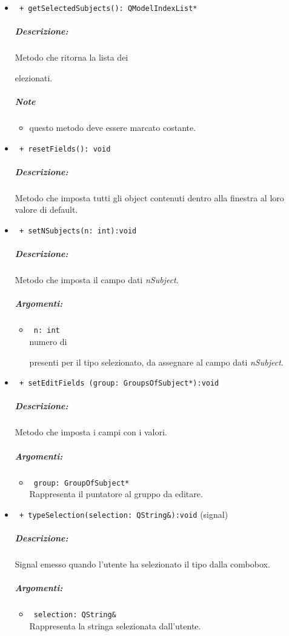 \begin{itemize}
\item \color{blue}\verb! + getSelectedSubjects(): QModelIndexList*!
\color{black} 
\subparagraph{Descrizione:}Metodo che ritorna la lista dei \subject selezionati.
\subparagraph{Note}
 \begin{itemize}
 \item questo metodo deve essere marcato costante.
 \end{itemize}

\item \color{blue}\verb! + resetFields(): void !
\color{black} 
\subparagraph{Descrizione:} Metodo che imposta tutti gli object contenuti dentro alla finestra al loro valore di default.

\item \color{blue}\verb! + setNSubjects(n: int):void!
\color{black} 
\subparagraph{Descrizione:} Metodo che imposta il campo dati \emph{nSubject}.
\subparagraph{Argomenti:}
 \begin{itemize}
 \item \color{RoyalPurple} \verb! n: int !\\numero di\subject{} presenti per il tipo selezionato, da assegnare al campo dati \emph{nSubject}.
 \end{itemize}
 
\item \color{blue}\verb! + setEditFields (group: GroupsOfSubject*):void!
\color{black} 
\subparagraph{Descrizione:} Metodo che imposta i campi con i valori.
\subparagraph{Argomenti:}
 \begin{itemize}
 \item \color{RoyalPurple} \verb! group: GroupOfSubject* !\\ Rappresenta il puntatore al gruppo da editare.
 \end{itemize} 
 
\item \color{blue}\verb! + typeSelection(selection: QString&):void! (signal)
\color{black}
\subparagraph{Descrizione:}
Signal\g{} emesso quando l'utente ha selezionato il tipo dalla combobox.
\subparagraph{Argomenti:}
\begin{itemize}
\item \color{RoyalPurple} \verb! selection: QString& ! \\ Rappresenta la stringa selezionata dall'utente.
\end{itemize}
\end{itemize}
\color{black}
\pagebreak


